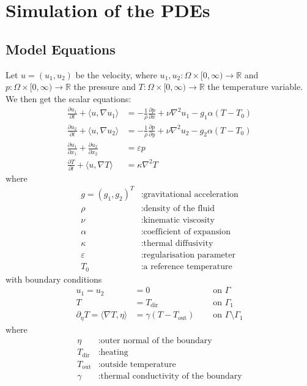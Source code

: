 \documentclass{article}
\begin{document}
\section{Simulation of the PDEs}
\subsection{Model Equations}
Let $u= (u_1,u_2)$ be the velocity, where $u_1,u_2: \Omega \times [0,\infty) \to \mathbb{R}$ and $p: \Omega \times [0,\infty) \to \mathbb{R}$ the pressure and $T : \Omega \times [0,\infty) \to \mathbb{R}$ the temperature variable. We then get the scalar equations:
\begin{align}
\frac{\partial u_1}{\partial t} + \langle u,\nabla u_1\rangle  &= -\frac{1}{\rho}\frac{\partial p}{\partial x}  + \nu \nabla^2 u_1 - g_1\alpha (T-T_0) \label{modeleq:1}\\
\frac{\partial u_2}{\partial t} + \langle u,\nabla u_2\rangle  &= -\frac{1}{\rho}\frac{\partial p}{\partial y} + \nu \nabla^2 u_2 - g_2\alpha (T-T_0) \label{modeleq:2}\\
\frac{\partial u_1}{\partial x_1} + \frac{\partial u_2}{\partial x_2} &= \varepsilon p \label{modeleq:3}\\
\frac{\partial T}{\partial t} + \langle u,\nabla T\rangle &= \kappa \nabla^2 T \label{modeleq:4}
\end{align}
where 
\begin{align*}
	g = \left(g_1,g_2\right)^T &: \text{gravitational acceleration}\\
	\rho &: \text{density of the fluid} \\
	\nu &: \text{kinematic viscosity} \\
	\alpha &: \text{coefficient of expansion} \\
	\kappa &: \text{thermal diffusivity} \\
	\varepsilon &: \text{regularisation parameter} \\
	T_0 &: \text{a reference temperature}
\end{align*}
with boundary conditions
\begin{align}
u_1 = u_2 &= 0 \quad &\text{ on } \Gamma\\
T &= T_\text{dir}\quad &\text{ on } \Gamma_1\\
\partial_\eta T = \langle \nabla T, \eta \rangle &= \gamma (T-T_\text{out}) \quad &\text{ on } \Gamma \setminus\Gamma_1
\end{align}
where
\begin{align*}
 \eta &: \text{outer normal of the boundary} \\
T_\text{dir} &: \text{heating} \\
T_\text{out} &: \text{outside temperature} \\
\gamma &: \text{thermal conductivity of the boundary}
 \end{align*}
\end{document}
